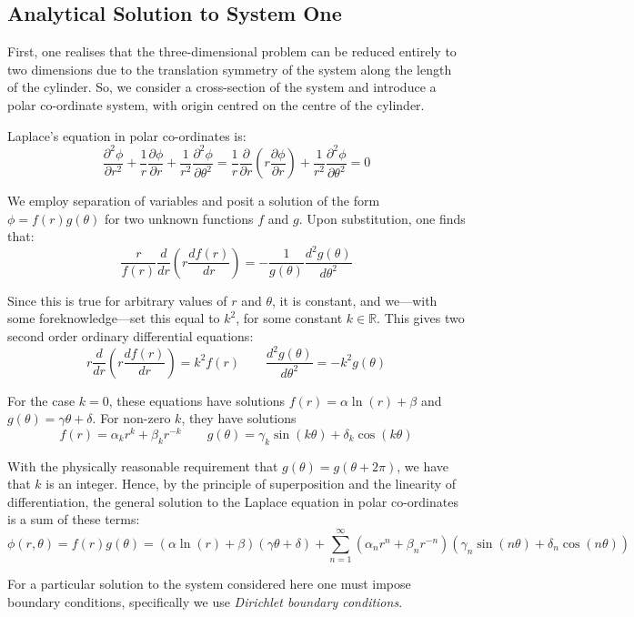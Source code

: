 \documentclass[12pt, a4paper]{article}
\newcommand{\be}{\begin{equation}}
\newcommand{\ee}{\end{equation}}
\begin{document}
\subsection{Analytical Solution to System One}

First, one realises that the three-dimensional problem can be reduced entirely to two
dimensions due to the translation symmetry of the system along the length of the
cylinder. So, we consider a cross-section of the system and introduce a polar
co-ordinate system, with origin centred on the centre of the cylinder.

Laplace's equation in polar co-ordinates is: 
%
\be
\frac{\partial^2 \phi}{\partial r^2}+\frac{1}{r}\frac{\partial \phi}{\partial r}+\frac{1}{r^2}\frac{\partial^2 \phi}{\partial \theta^2}
= \frac{1}{r}\frac{\partial}{\partial r}(r \frac{\partial \phi}{\partial r}) + \frac{1}{r^2}\frac{\partial ^2 \phi}{\partial \theta^2}
= 0
\ee

We employ separation of variables and posit a solution of the form
$\phi = f(r)g(\theta)$ for two unknown functions $f$ and $g$. Upon substitution,
one finds that:
%
\be
\frac{r}{f(r)}\frac{d}{dr}(r \frac{df(r)}{dr}) =- \frac{1}{g(\theta)}\frac{d^2 g(\theta)}{d\theta^2}
\ee

Since this is true for arbitrary values of $r$ and $\theta$, it is constant, and
we---with some foreknowledge---set this equal to $k^2$, for some constant 
$k\in\mathbb{R}$.
This gives two second order ordinary differential equations:
%
\be
r\frac{d}{dr}(r \frac{df(r)}{dr}) = k^2 f(r) \qquad
\frac{d^2 g(\theta)}{d\theta^2}=-k^2 g(\theta)
\ee

For the case $k=0$, these equations have solutions
$f(r)=\alpha \ln(r) + \beta$ and $g(\theta) = \gamma \theta + \delta$.
For non-zero $k$, they have solutions
%
\be
f(r)=\alpha_k r^k + \beta_k r^{-k}
\qquad
g(\theta)= \gamma_k \sin(k\theta)+\delta_k \cos(k\theta)
\ee

With the physically reasonable requirement that $g(\theta)=g(\theta + 2\pi)$, we have
that $k$ is an integer. Hence, by the principle of superposition and the linearity of
differentiation, the general solution to the Laplace equation in polar co-ordinates is
a sum of these terms:
%
\be
\phi(r,\theta)
= f(r)g(\theta)
= (\alpha \ln(r) + \beta)(\gamma\theta + \delta) + \sum_{n=1}^{\infty}(\alpha_n r^n+\beta_n r^{-n})(\gamma_n \sin(n\theta) + \delta_n \cos(n\theta))
\ee

For a particular solution to the system considered here one must impose boundary
conditions, specifically we use \emph{Dirichlet boundary conditions}.
\end{document}
